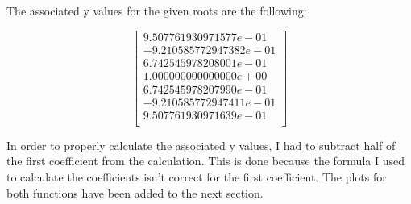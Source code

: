 \documentclass{article}
\begin{document}
The associated y values for the given roots are the following:

$$
\begin{bmatrix} 
9.507761930971577e-01\\
-9.210585772947382e-01\\
6.742545978208001e-01\\
1.000000000000000e+00\\
6.742545978207990e-01\\
-9.210585772947411e-01\\
9.507761930971639e-01\\
\end{bmatrix}
$$

In order to properly calculate the associated y values, I had to subtract half of the first coefficient from the calculation. This is done because the formula I used to calculate the coefficients isn't correct for the first coefficient. The plots for both functions have been added to the next section.
\end{document}
